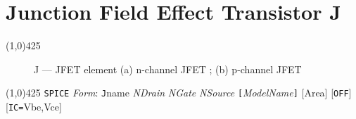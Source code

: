 
\oddsidemargin 10mm \topmargin 0.0in \textwidth 5.5in \textheight
7.375in
\evensidemargin 1.0in \headheight 0.18in \footskip 0.16in
%
\section[J \- JFET]{\LARGE \textbf{Junction Field Effect Transistor} \hspace{40mm}\huge \textbf{J}}
\linethickness{1mm} \line(1,0){425} \normalsize
\begin{figure}[h]
\centerline{\epsfxsize=2.4in} \caption{J --- JFET
element (a) n-channel JFET ; (b) p-channel JFET}
\end{figure}
\newline
\linethickness{0.5mm} \line(1,0){425}
\newline
\noindent\texttt{SPICE} \textit{Form}:
\newline
{\tt J}name  \textit{NDrain} \textit{NGate} \textit{NSource} \texttt{[}\textit{ModelName}\texttt{]} [Area] [{\tt OFF}] [{\tt IC=}Vbe,Vce]\\

